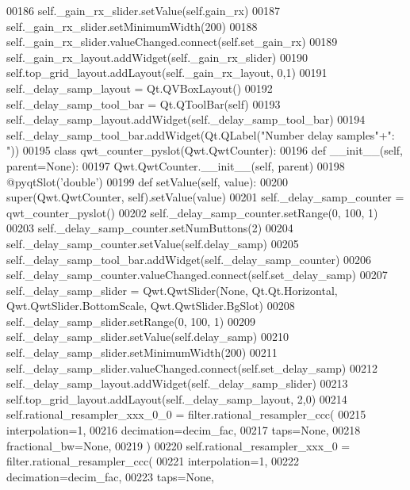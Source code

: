 \begin{DoxyCode}
00186         self.\_gain\_rx\_slider.setValue(self.gain_rx)
00187         self.\_gain\_rx\_slider.setMinimumWidth(200)
00188         self.\_gain\_rx\_slider.valueChanged.connect(self.set_gain_rx)
00189         self.\_gain\_rx\_layout.addWidget(self._gain_rx_slider)
00190         self.top\_grid\_layout.addLayout(self._gain_rx_layout, 0,1)
00191         self._delay_samp_layout = Qt.QVBoxLayout()
00192         self._delay_samp_tool_bar = Qt.QToolBar(self)
00193         self.\_delay\_samp\_layout.addWidget(self._delay_samp_tool_bar)
00194         self.\_delay\_samp\_tool\_bar.addWidget(Qt.QLabel(\textcolor{stringliteral}{"Number delay samples"}+\textcolor{stringliteral}{": "}))
00195         \textcolor{keyword}{class }qwt\_counter\_pyslot(Qwt.QwtCounter):
00196             \textcolor{keyword}{def }__init__(self, parent=None):
00197                 Qwt.QwtCounter.\_\_init\_\_(self, parent)
00198             @pyqtSlot(\textcolor{stringliteral}{'double'})
00199             \textcolor{keyword}{def }setValue(self, value):
00200                 super(Qwt.QwtCounter, self).setValue(value)
00201         self._delay_samp_counter = qwt\_counter\_pyslot()
00202         self.\_delay\_samp\_counter.setRange(0, 100, 1)
00203         self.\_delay\_samp\_counter.setNumButtons(2)
00204         self.\_delay\_samp\_counter.setValue(self.delay_samp)
00205         self.\_delay\_samp\_tool\_bar.addWidget(self._delay_samp_counter)
00206         self.\_delay\_samp\_counter.valueChanged.connect(self.set_delay_samp)
00207         self._delay_samp_slider = Qwt.QwtSlider(\textcolor{keywordtype}{None}, Qt.Qt.Horizontal, Qwt.QwtSlider.BottomScale, 
      Qwt.QwtSlider.BgSlot)
00208         self.\_delay\_samp\_slider.setRange(0, 100, 1)
00209         self.\_delay\_samp\_slider.setValue(self.delay_samp)
00210         self.\_delay\_samp\_slider.setMinimumWidth(200)
00211         self.\_delay\_samp\_slider.valueChanged.connect(self.set_delay_samp)
00212         self.\_delay\_samp\_layout.addWidget(self._delay_samp_slider)
00213         self.top\_grid\_layout.addLayout(self._delay_samp_layout, 2,0)
00214         self.rational_resampler_xxx_0_0 = filter.rational\_resampler\_ccc(
00215                 interpolation=1,
00216                 decimation=decim\_fac,
00217                 taps=\textcolor{keywordtype}{None},
00218                 fractional\_bw=\textcolor{keywordtype}{None},
00219         )
00220         self.rational_resampler_xxx_0 = filter.rational\_resampler\_ccc(
00221                 interpolation=1,
00222                 decimation=decim\_fac,
00223                 taps=\textcolor{keywordtype}{None},

\end{DoxyCode}
